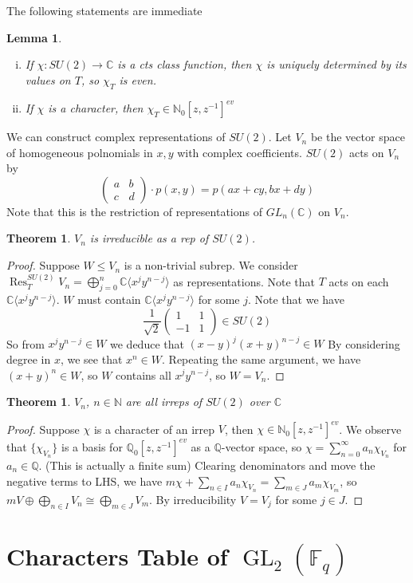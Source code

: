 \documentclass{article}
\theoremstyle{definition}
\theoremstyle{remark}
\theoremstyle{plain}
\newtheorem{lem}[defn]{Lemma}
\newtheorem{thm}[defn]{Theorem}
\newcommand{\NN}{\mathbb{N}}
\newcommand{\QQ}{\mathbb{Q}}
\newcommand{\CC}{\mathbb{C}}
\newcommand{\FF}{\mathbb{F}}
\newcommand{\Res}{\operatorname{Res}}
\begin{document}
The following statements are immediate
\begin{lem}
    \begin{enumerate}[(i)]
        \item If $\chi:SU(2)\to \CC$ is a cts class function, then $\chi$ is uniquely determined by its values on $T$, so $\chi_T$ is even.
        \item If $\chi$ is a character, then $\chi_T\in \NN_0[z,z^{-1}]^{ev}$
    \end{enumerate}
\end{lem}


We can construct complex representations of $SU(2)$. Let $V_n$ be the vector space of homogeneous polnomials in $x,y$ with complex coefficients. $SU(2)$ acts on $V_n$ by 
\[\begin{pmatrix}
    a&b\\c&d
\end{pmatrix}\cdot p(x,y)=p(ax+cy,bx+dy)\]
Note that this is the restriction of representations of $GL_n(\CC)$ on $V_n$.

\begin{thm}
    $V_n$ is irreducible as a rep of $SU(2)$.
\end{thm}
\begin{proof}
    Suppose $W\le V_n$ is a non-trivial subrep. We consider $\Res^{SU(2)}_T V_n=\bigoplus_{j=0}^n\CC\langle x^jy^{n-j}\rangle$ as representations. Note that $T$ acts on each $\CC\langle x^jy^{n-j}\rangle$. $W$ must contain $\CC\langle x^jy^{n-j}\rangle$ for some $j$. Note that we have 
    \[\frac{1}{\sqrt 2}\begin{pmatrix}
        1&1\\-1&1
    \end{pmatrix}\in SU(2)\]
    So from $x^jy^{n-j}\in W$ we deduce that $(x-y)^j(x+y)^{n-j}\in W$ By considering degree in $x$, we see that $x^n\in W$. Repeating the same argument, we have $(x+y)^n\in W$, so $W$ contains all $x^jy^{n-j}$, so $W=V_n$.
\end{proof}
\begin{thm}
    $V_n$, $n\in\NN$ are all irreps of $SU(2)$ over $\CC$
\end{thm}
\begin{proof}
    Suppose $\chi$ is a character of an irrep $V$, then $\chi\in\NN_0[z,z^{-1}]^{ev}$. We observe that $\{\chi_{V_n}\}$ is a basis for $\QQ_0[z,z^{-1}]^{ev}$ as a $\QQ$-vector space, so $\chi=\sum_{n=0}^\infty a_n\chi_{V_n}$ for $a_n\in\QQ$. (This is actually a finite sum) Clearing denominators and move the negative terms to LHS, we have $m\chi+\sum_{n\in I}a_n\chi_{V_n}=\sum_{m\in J}a_m\chi_{V_m}$, so $mV\oplus \bigoplus_{n\in I}V_n\cong \bigoplus_{m\in J}V_m$. By irreducibility $V=V_j$ for some $j\in J$. 
\end{proof}

\section{Characters Table of $\operatorname{GL}_2(\FF_q)$}
\end{document}
